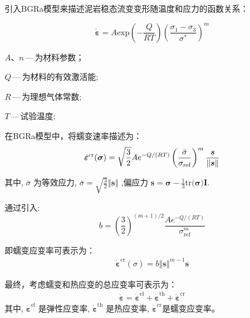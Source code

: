 引入BGRa模型来描述泥岩稳态流变变形随温度和应力的函数关系：

\begin{equation}
    \dot{\boldsymbol{\varepsilon}}=A\mathrm{exp}\left ( -\frac{Q}{RT}\right ) \left (\frac{\sigma_1-\sigma_3}{\sigma^*}\right )^m
\end{equation}
\begin{shizhong}
    \item $A$、$n$\,---\,为材料参数；
    \item $Q$\,---\,为材料的有效激活能;
    \item $R$\,---\,为理想气体常数;
    \item $T$\,---\,试验温度;
\end{shizhong}

在BGRa模型中，将蠕变速率描述为：
\begin{equation}
    \begin{gathered}
        \dot { \boldsymbol{\varepsilon}}^\text{cr} ({ \boldsymbol{\sigma}})={\color{black} {\sqrt{\frac{3}{2}}}}Ae^{-Q/(RT)}\left(\dfrac{{\bar \sigma}}{\sigma_\text{ref}}\right)^m\dfrac{{\boldsymbol s}}{{\left\Vert{\boldsymbol s}\right\Vert}}
    \end{gathered}
\end{equation}

其中, ${ \bar\sigma}$ 为等效应力, ${ \bar\sigma}={\sqrt{{\frac{3}{2}}}}{\left\Vert{\boldsymbol s}\right\Vert}$ ,偏应力 ${\boldsymbol s}= { \boldsymbol{ \sigma}}-\frac{1}{3}{ \mathrm{tr}(\boldsymbol{\sigma}}){\mathbf I}$.

通过引入:
\begin{equation}
    b={\left(\dfrac{3}{2}\right)^{(m+1)/2}} \dfrac{Ae^{-Q/(RT)}}{\sigma_\text{ref}^m}
\end{equation}

即蠕变应变率可表示为：
\begin{equation}
    \begin{gathered}
        \dot { \boldsymbol{\varepsilon}}^\text{cr} ({ \sigma}) = b {\left\Vert{\boldsymbol s}\right\Vert}^{m-1} {\boldsymbol s}
    \end{gathered}
    \label{eq:bgra}
\end{equation}

最终，考虑蠕变和热应变的总应变率可表示为：
\begin{equation}
    \begin{gathered}
        \dot { \boldsymbol{\varepsilon} }= \dot { \boldsymbol{\varepsilon}}^\text{el} + \dot {\boldsymbol{\varepsilon}}^\text{th}
        + \dot { \boldsymbol{\varepsilon}}^\text{cr}
    \end{gathered}
\end{equation}
其中, $\dot {\boldsymbol{\varepsilon}}^\text{el}$ 是弹性应变率, $\dot { \boldsymbol{\varepsilon}}^\text{th}$ 是热应变率,  $\dot {\boldsymbol{\varepsilon}}^\text{cr}$是蠕变应变率。


